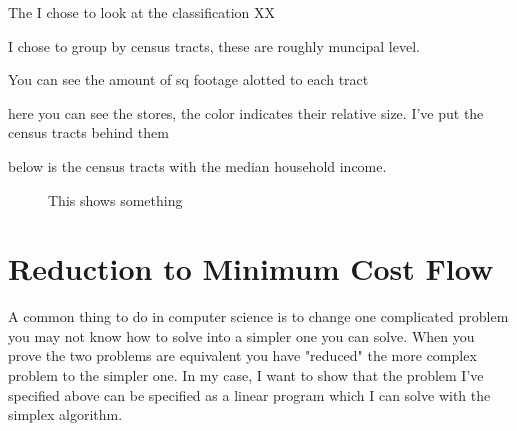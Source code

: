 \documentclass{report}
\begin{document}
The I chose to look at the classification XX

I chose to group by census tracts, these are roughly muncipal level.

You can see the amount of sq footage alotted to each tract

here you can see the stores, the color indicates their relative size. I've put the census tracts behind them

below is the census tracts with the median household income.

\begin{figure}
\centering
\begin{framed}
\caption{This shows something}
\end{framed}
\end{figure}


\section{Reduction to Minimum Cost Flow}

A common thing to do in computer science is to change one complicated problem you may not know how to solve into a simpler one you can solve. When you prove the two problems are equivalent you have "reduced" the more complex problem to the simpler one. In my case, I want to show that the problem I've specified above can be specified as a linear program which I can solve with the simplex algorithm.
\end{document}
